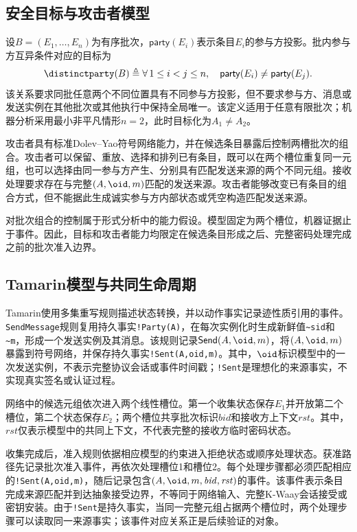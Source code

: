 \subsection{安全目标与攻击者模型}
\label{subsec:objective-adversary}

设$B=(E_1,\ldots,E_n)$为有序批次，$\mathsf{party}(E_i)$表示条目$E_i$的参与方投影。批内参与方互异条件对应的目标为
\begin{equation}
  \distinctparty(B)
  \triangleq
  \forall\,1\leq i<j\leq n,\quad
  \mathsf{party}(E_i)\neq\mathsf{party}(E_j).
  \label{eq:distinct-party-objective}
\end{equation}
该关系要求同批任意两个不同位置具有不同参与方投影，但不要求参与方、消息或发送实例在其他批次或其他执行中保持全局唯一。该定义适用于任意有限批次；机器分析采用最小非平凡情形$n=2$，此时目标化为$A_1\neq A_2$。

攻击者具有标准Dolev--Yao符号网络能力，并在候选条目暴露后控制两槽批次的组合。攻击者可以保留、重放、选择和排列已有条目，既可以在两个槽位重复同一元组，也可以选择由同一参与方产生、分别具有匹配发送来源的两个不同元组。接收处理要求存在与完整$(A,\oid,m)$匹配的发送来源。攻击者能够改变已有条目的组合方式，但不能据此生成诚实参与方内部状态或凭空构造匹配发送来源。

对批次组合的控制属于形式分析中的能力假设。模型固定为两个槽位，机器证据止于\receiveraccept 事件。因此，目标和攻击者能力均限定在候选条目形成之后、完整密码处理完成之前的批次准入边界。

\subsection{Tamarin模型与共同生命周期}
\label{subsec:common-lifecycle}

Tamarin使用多集重写规则描述状态转换，并以动作事实记录迹性质引用的事件\cite{meier2013tamarin}。\texttt{SendMessage}规则复用持久事实\texttt{!Party(A)}，在每次实例化时生成新鲜值\texttt{\textasciitilde sid}和\texttt{\textasciitilde m}，形成一个发送实例及其消息。该规则记录$\mathsf{Send}(A,\oid,m)$，将$(A,\oid,m)$暴露到符号网络，并保存持久事实\texttt{!Sent(A,oid,m)}。其中，$\oid$标识模型中的一次发送实例，不表示完整协议会话或事件时间戳；\texttt{!Sent}是理想化的来源事实，不实现真实签名或认证过程。

网络中的候选元组依次进入两个线性槽位。第一个收集状态保存$E_1$并开放第二个槽位，第二个状态保存$E_2$；两个槽位共享批次标识$\mathit{bid}$和接收方上下文$\mathit{rst}$。其中，$\mathit{rst}$仅表示模型中的共同上下文，不代表完整的接收方临时密码状态。

收集完成后，准入规则依据相应模型的约束进入拒绝状态或顺序处理状态。获准路径先记录批次准入事件\batchreceive，再依次处理槽位1和槽位2。每个处理步骤都必须匹配相应的\texttt{!Sent(A,oid,m)}，随后记录包含$(A,\oid,m,\mathit{bid},\mathit{rst})$的\receiveraccept 事件。该事件表示条目完成来源匹配并到达抽象接受边界，不等同于网络输入、完整K-Waay会话接受或密钥安装。由于\texttt{!Sent}是持久事实，当同一完整元组占据两个槽位时，两个处理步骤可以读取同一来源事实；该事件对应关系正是后续验证的对象。

